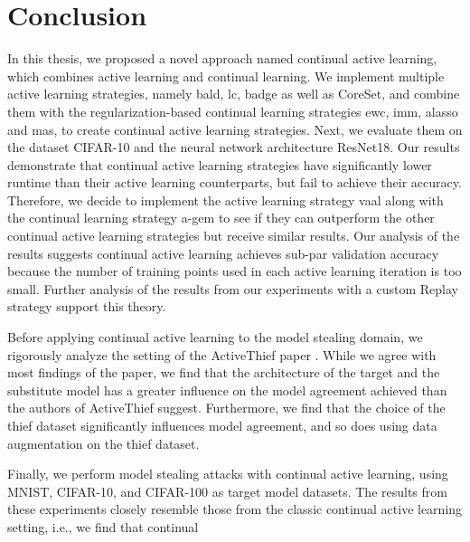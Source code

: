 
\chapter{Conclusion}
\label{ch:Conclusion}
In this thesis, we proposed a novel approach named continual active learning, which combines active learning and continual learning. 
We implement multiple active learning strategies, namely \gls{bald}, \gls{lc}, \gls{badge} as well as CoreSet, and combine them with
the regularization-based continual learning strategies \gls{ewc}, \gls{imm}, \gls{alasso} and \gls{mas}, to create continual active
learning strategies. Next, we evaluate them on the dataset CIFAR-10 and the neural network architecture ResNet18. Our results demonstrate
that continual active learning strategies have significantly lower runtime than their active learning counterparts, but fail to achieve
their accuracy. Therefore, we decide to implement the active learning strategy \gls{vaal} along with the continual learning strategy \gls{a-gem}
to see if they can outperform the other continual active learning strategies but receive similar results. Our analysis of the results
suggests continual active learning achieves sub-par validation accuracy because the number of training points used in each active
learning iteration is too small. Further analysis of the results from our experiments with a custom Replay strategy support this theory. \par
Before applying continual active learning to the model stealing domain, we rigorously analyze the setting of the ActiveThief paper
\cite{pal2020activethief}. While we agree with most findings of the paper, we find that the architecture of the target and the substitute
model has a greater influence on the model agreement achieved than the authors of ActiveThief suggest. Furthermore, we find that the
choice of the thief dataset significantly influences model agreement, and so does using data augmentation on the thief dataset. \par
Finally, we perform model stealing attacks with continual active learning, using MNIST, CIFAR-10, and CIFAR-100 as target model datasets.
The results from these experiments closely resemble those from the classic continual active learning setting, i.e., we find that continual
